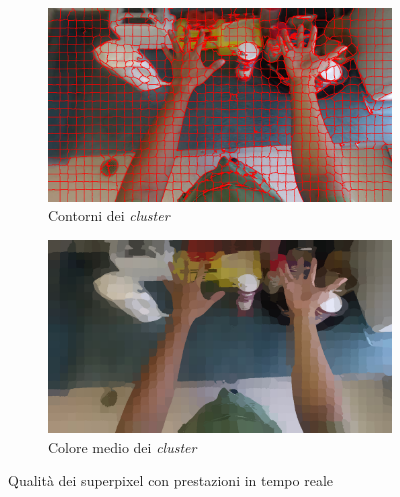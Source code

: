 \documentclass[12pt,a4paper,oneside]{article}
\begin{document}
\begin{figure}[!htb]	
	\centering
	\begin{subfigure}[t]{.495\textwidth}
		\includegraphics[width=\textwidth]{resources/images/realtime_contorni.png}
		\caption{Contorni dei \textit{cluster}}
	\end{subfigure}%
	\hfill
	\begin{subfigure}[t]{.495\textwidth}
		\includegraphics[width=\textwidth]{resources/images/realtime_superpixel.png}
		\caption{Colore medio dei \textit{cluster}}
	\end{subfigure}%
	\caption{Qualità dei superpixel con prestazioni in tempo reale}\label{es_real_time}
\end{figure}
\end{document}
